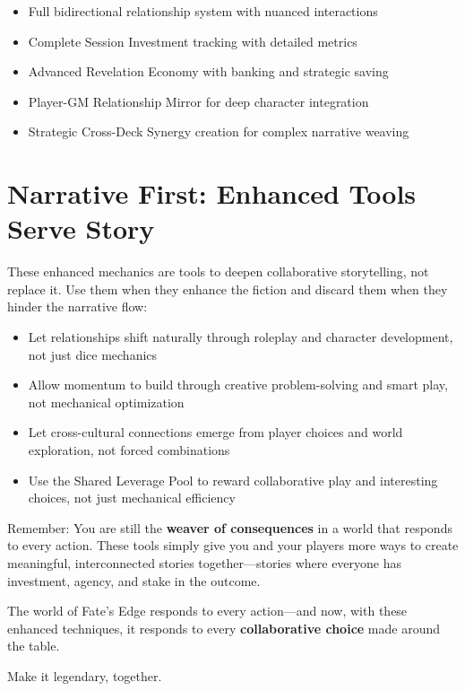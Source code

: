 \begin{itemize}
    \item Full bidirectional relationship system with nuanced interactions
    \item Complete Session Investment tracking with detailed metrics
    \item Advanced Revelation Economy with banking and strategic saving
    \item Player-GM Relationship Mirror for deep character integration
    \item Strategic Cross-Deck Synergy creation for complex narrative weaving
\end{itemize}

\section*{Narrative First: Enhanced Tools Serve Story}

These enhanced mechanics are tools to deepen collaborative storytelling, not replace it. Use them when they enhance the fiction and discard them when they hinder the narrative flow:

\begin{itemize}
    \item Let relationships shift naturally through roleplay and character development, not just dice mechanics
    \item Allow momentum to build through creative problem-solving and smart play, not mechanical optimization
    \item Let cross-cultural connections emerge from player choices and world exploration, not forced combinations
    \item Use the Shared Leverage Pool to reward collaborative play and interesting choices, not just mechanical efficiency
\end{itemize}

Remember: You are still the \textbf{weaver of consequences} in a world that responds to every action. These tools simply give you and your players more ways to create meaningful, interconnected stories together---stories where everyone has investment, agency, and stake in the outcome.

The world of Fate's Edge responds to every action---and now, with these enhanced techniques, it responds to every \textbf{collaborative choice} made around the table.

Make it legendary, together.

